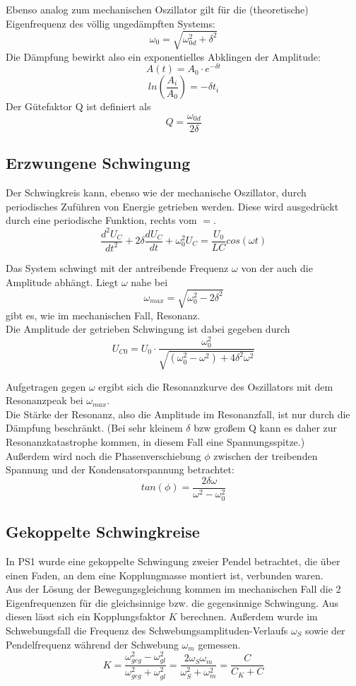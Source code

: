 \documentclass[12pt,a4paper]{article}
\begin{document}
\begin{multicols}{2}
\noindent Ebenso analog zum mechanischen Oszillator gilt für die (theoretische) Eigenfrequenz des völlig ungedämpften Systems:
$$\omega_0 = \sqrt{\omega_{0d}^2 + \delta^2}$$
\noindent Die Dämpfung bewirkt also ein exponentielles Abklingen der Amplitude:
$$A(t) = A_0 \cdot e^{-\delta t}$$
$$ln(\frac{A_i}{A_0}) = -\delta t_i$$
Der Gütefaktor Q ist definiert als
$$Q = \frac{\omega_{0d}}{2\delta}$$

\subsection{Erzwungene Schwingung}
Der Schwingkreis kann, ebenso wie der mechanische Oszillator, durch periodisches Zuführen von Energie getrieben werden. Diese wird ausgedrückt durch eine periodische Funktion, rechts vom $=$.
$$\frac{d^2U_C}{dt^2} + 2 \delta\frac{dU_C}{dt} + \omega_{0}^2U_C = \frac{U_0}{LC} cos(\omega t)$$

Das System schwingt mit der antreibende Frequenz $\omega$ von der auch die Amplitude abhängt. Liegt $\omega$ nahe bei $$\omega_{max} = \sqrt{\omega_0^2 - 2\delta^2}$$gibt es, wie im mechanischen Fall, Resonanz.\\
Die Amplitude der getrieben Schwingung ist dabei gegeben durch
$$U_{C0} = U_0 \cdot \frac{\omega_0^2}{\sqrt{ (\omega_0^2 - \omega^2) + 4\delta^2 \omega^2}}$$

\noindent Aufgetragen gegen $\omega$ ergibt sich die Resonanzkurve des Oszillators mit dem Resonanzpeak bei $\omega_{max}$.\\
Die Stärke der Resonanz, also die Amplitude im Resonanzfall, ist nur durch die Dämpfung beschränkt. (Bei sehr kleinem $\delta$ bzw großem Q kann es daher zur Resonanzkatastrophe kommen, in diesem Fall eine Spannungsspitze.)\\

\noindent Außerdem wird noch die Phasenverschiebung $\phi$ zwischen der treibenden Spannung und der Kondensatorspannung betrachtet:
$$tan(\phi) = \frac{2 \delta \omega}{\omega^2 - \omega_0^2}$$

\subsection{Gekoppelte Schwingkreise}

In PS1 wurde eine gekoppelte Schwingung zweier Pendel betrachtet, die über einen Faden, an dem eine Kopplungmasse montiert ist, verbunden waren.\\
Aus der Lösung der Bewegungsgleichung kommen im mechanischen Fall die 2 Eigenfrequenzen für die gleichsinnige bzw. die gegensinnige Schwingung. Aus diesen lässt sich ein Kopplungsfaktor $K$ berechnen. Außerdem wurde im Schwebungsfall die Frequenz des Schwebungsamplituden-Verlaufs $\omega_S$ sowie der Pendelfrequenz während der Schwebung $\omega_m$ gemessen.
$$K=\frac{\omega_{geg}^2-\omega_{gl}^2}{\omega_{geg}^2+\omega_{gl}^2}=
\frac{2\omega_S \omega_m}{\omega_{S}^2+\omega_{m}^2}=\frac{C}{C_K + C}$$


\end{multicols}
\end{document}
